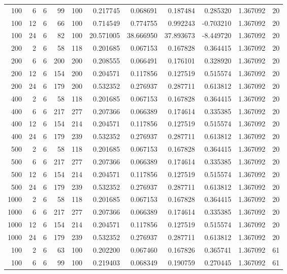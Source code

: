 \begin{table}
\begin{tabular}{rrrrrrrrrrr}
100 & 6 & 6 & 99 & 100 & 0.217745 & 0.068691 & 0.187484 & 0.285320 & 1.367092 & 20 \\
100 & 12 & 6 & 66 & 100 & 0.714549 & 0.774755 & 0.992243 & -0.703210 & 1.367092 & 20 \\
100 & 24 & 6 & 82 & 100 & 20.571005 & 38.666950 & 37.893673 & -8.449720 & 1.367092 & 20 \\
200 & 2 & 6 & 58 & 118 & 0.201685 & 0.067153 & 0.167828 & 0.364415 & 1.367092 & 20 \\
200 & 6 & 6 & 200 & 200 & 0.208555 & 0.066491 & 0.176101 & 0.328920 & 1.367092 & 20 \\
200 & 12 & 6 & 154 & 200 & 0.204571 & 0.117856 & 0.127519 & 0.515574 & 1.367092 & 20 \\
200 & 24 & 6 & 179 & 200 & 0.532352 & 0.276937 & 0.287711 & 0.613812 & 1.367092 & 20 \\
400 & 2 & 6 & 58 & 118 & 0.201685 & 0.067153 & 0.167828 & 0.364415 & 1.367092 & 20 \\
400 & 6 & 6 & 217 & 277 & 0.207366 & 0.066389 & 0.174614 & 0.335385 & 1.367092 & 20 \\
400 & 12 & 6 & 154 & 214 & 0.204571 & 0.117856 & 0.127519 & 0.515574 & 1.367092 & 20 \\
400 & 24 & 6 & 179 & 239 & 0.532352 & 0.276937 & 0.287711 & 0.613812 & 1.367092 & 20 \\
500 & 2 & 6 & 58 & 118 & 0.201685 & 0.067153 & 0.167828 & 0.364415 & 1.367092 & 20 \\
500 & 6 & 6 & 217 & 277 & 0.207366 & 0.066389 & 0.174614 & 0.335385 & 1.367092 & 20 \\
500 & 12 & 6 & 154 & 214 & 0.204571 & 0.117856 & 0.127519 & 0.515574 & 1.367092 & 20 \\
500 & 24 & 6 & 179 & 239 & 0.532352 & 0.276937 & 0.287711 & 0.613812 & 1.367092 & 20 \\
1000 & 2 & 6 & 58 & 118 & 0.201685 & 0.067153 & 0.167828 & 0.364415 & 1.367092 & 20 \\
1000 & 6 & 6 & 217 & 277 & 0.207366 & 0.066389 & 0.174614 & 0.335385 & 1.367092 & 20 \\
1000 & 12 & 6 & 154 & 214 & 0.204571 & 0.117856 & 0.127519 & 0.515574 & 1.367092 & 20 \\
1000 & 24 & 6 & 179 & 239 & 0.532352 & 0.276937 & 0.287711 & 0.613812 & 1.367092 & 20 \\
100 & 2 & 6 & 63 & 100 & 0.202200 & 0.067460 & 0.167826 & 0.365741 & 1.367092 & 61 \\
100 & 6 & 6 & 99 & 100 & 0.219403 & 0.068349 & 0.190759 & 0.270445 & 1.367092 & 61 \\

\end{tabular}
\end{table}
